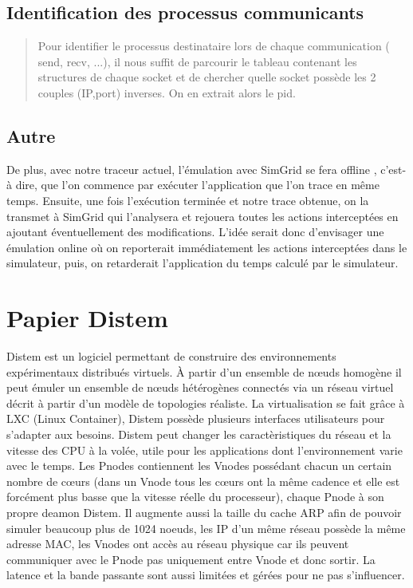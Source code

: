 \documentclass{article}
\begin{document}
\subsection{Identification des processus communicants}
\begin{quotation}
Pour identifier le processus destinataire lors de chaque communication ( send,
recv, ...), il nous suffit de parcourir le tableau contenant les structures de
chaque socket et de chercher quelle socket possède les 2 couples (IP,port)
inverses. On en extrait alors le pid.
\end{quotation}

\subsection{Autre}
De plus, avec notre traceur actuel, l’émulation avec SimGrid se fera offline ,
c’est-à dire, que l’on commence par exécuter l’application que l’on trace en
même temps. Ensuite, une fois l’exécution terminée et notre trace obtenue, on la
transmet à SimGrid qui l’analysera et rejouera toutes les actions interceptées
en ajoutant éventuellement des modifications. L’idée serait donc d’envisager une
émulation online où on reporterait immédiatement les actions interceptées dans
le simulateur, puis, on retarderait l’application du temps calculé par le
simulateur.

\section{Papier Distem}
Distem est un logiciel permettant de construire des environnements expérimentaux
distribués virtuels. À partir d'un ensemble de n\oe uds homogène il peut émuler
un ensemble de n\oe uds hétérogènes connectés via un réseau virtuel décrit à
partir d'un modèle de topologies réaliste. La virtualisation se fait grâce à LXC
(Linux Container), Distem possède plusieurs interfaces utilisateurs pour
s'adapter aux besoins. Distem peut changer les caractèristiques du réseau et la
vitesse des CPU à la volée, utile pour les applications dont l'environnement
varie avec le temps. Les Pnodes contiennent les Vnodes possédant chacun un
certain nombre de c\oe urs (dans un Vnode tous les c\oe urs ont la même cadence
et elle est forcément plus basse que la vitesse réelle du processeur), chaque
Pnode à son propre deamon Distem. Il augmente aussi la taille du cache ARP afin
de pouvoir simuler beaucoup plus de 1024 noeuds, les IP d'un même réseau possède
la même adresse MAC, les Vnodes ont accès au réseau physique car ils peuvent
communiquer avec le Pnode pas uniquement entre Vnode et donc sortir. La latence
et la bande passante sont aussi limitées et gérées pour ne pas s'influencer.
\end{document}
